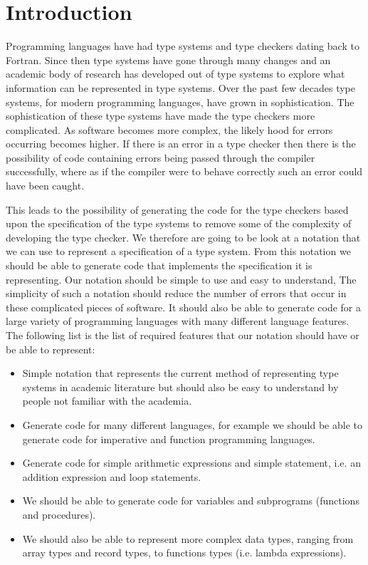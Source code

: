 \chapter{Introduction}
\label{chap:intro}
Programming languages have had type systems and type checkers dating back to Fortran\cite{Backus:1978:HFI:960118.808380}.
Since then type systems have gone through many changes and an academic body of research has developed out of type systems to explore what information can be represented in type systems\cite{cardelli1996type}.
Over the past few decades type systems, for modern programming languages, have grown in sophistication.
The sophistication of these type systems have made the type checkers more complicated.
As software becomes more complex, the likely hood for errors occurring becomes higher.
If there is an error in a type checker then there is the possibility of code containing errors being passed through the compiler successfully, where as if the compiler were to behave correctly such an error could have been caught.

This leads to the possibility of generating the code for the type checkers based upon the specification of the type systems to remove some of the complexity of developing the type checker.
We therefore are going to be look at a notation that we can use to represent a specification of a type system.
From this notation we should be able to generate code that implements the specification it is representing.
Our notation should be simple to use and easy to understand, The simplicity of such a notation should reduce the number of errors that occur in these complicated pieces of software.
It should also be able to generate code for a large variety of programming languages with many different language features.
The following list is the list of required features that our notation should have or be able to represent:
\begin{itemize}
    \label{itms:aims}
    \item Simple notation that represents the current method of representing type systems in academic literature but should also be easy to understand by people not familiar with the academia.
    \item Generate code for many different languages, for example we should be able to generate code for imperative and function programming languages.
    \item Generate code for simple arithmetic expressions and simple statement, i.e. an addition expression and loop statements.
    \item We should be able to generate code for variables and subprograms (functions and procedures).
    \item We should also be able to represent more complex data types, ranging from array types and record types, to functions types (i.e. lambda expressions).
\end{itemize}

